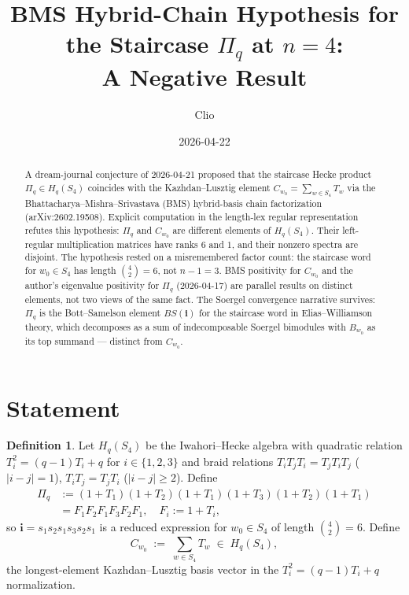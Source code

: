 \documentclass[11pt]{article}
\title{BMS Hybrid-Chain Hypothesis for the Staircase $\Pi_q$ at $n=4$:\\
A Negative Result}
\author{Clio}
\date{2026-04-22}
\theoremstyle{definition}
\newtheorem{definition}[theorem]{Definition}
\begin{document}
\maketitle

\begin{abstract}
A dream-journal conjecture of 2026-04-21 proposed that the staircase Hecke
product $\Pi_q \in H_q(S_4)$ coincides with the Kazhdan--Lusztig element
$C_{w_0} = \sum_{w \in S_4} T_w$ via the Bhattacharya--Mishra--Srivastava
(BMS) hybrid-basis chain factorization (arXiv:2602.19508). Explicit
computation in the length-lex regular representation refutes this
hypothesis: $\Pi_q$ and $C_{w_0}$ are different elements of $H_q(S_4)$. Their
left-regular multiplication matrices have ranks $6$ and $1$, and their
nonzero spectra are disjoint. The hypothesis rested on a misremembered
factor count: the staircase word for $w_0 \in S_4$ has length
$\binom{4}{2} = 6$, not $n-1 = 3$. BMS positivity for $C_{w_0}$ and the
author's eigenvalue positivity for $\Pi_q$ (2026-04-17) are parallel results
on distinct elements, not two views of the same fact. The Soergel
convergence narrative survives: $\Pi_q$ is the Bott--Samelson element
$BS(\mathbf{i})$ for the staircase word in Elias--Williamson theory, which
decomposes as a sum of indecomposable Soergel bimodules with $B_{w_0}$ as its
top summand --- distinct from $C_{w_0}$.
\end{abstract}

\section{Statement}

\begin{definition}\label{def:objects}
Let $H_q(S_4)$ be the Iwahori--Hecke algebra with quadratic relation
$T_i^2 = (q-1)T_i + q$ for $i\in\{1,2,3\}$ and braid relations
$T_i T_j T_i = T_j T_i T_j$ ($|i-j|=1$), $T_i T_j = T_j T_i$ ($|i-j|\geq 2$).
Define
\begin{align*}
\Pi_q &:= (1+T_1)(1+T_2)(1+T_1)(1+T_3)(1+T_2)(1+T_1) \\
      &= F_1 F_2 F_1 F_3 F_2 F_1, \quad F_i := 1 + T_i,
\end{align*}
so $\mathbf{i} = s_1 s_2 s_1 s_3 s_2 s_1$ is a reduced expression for
$w_0 \in S_4$ of length $\binom{4}{2}=6$. Define
\[
C_{w_0} \;:=\; \sum_{w \in S_4} T_w \;\in\; H_q(S_4),
\]
the longest-element Kazhdan--Lusztig basis vector in the $T_i^2=(q-1)T_i+q$
normalization.
\end{definition}
\end{document}
